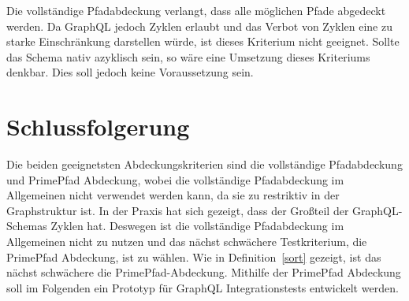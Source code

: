 Die vollständige Pfadabdeckung verlangt, dass alle möglichen Pfade abgedeckt werden.
Da GraphQL jedoch Zyklen erlaubt und das Verbot von Zyklen eine zu starke Einschränkung darstellen würde, ist dieses Kriterium nicht geeignet.
Sollte das Schema nativ azyklisch sein, so wäre eine Umsetzung dieses Kriteriums denkbar.
Dies soll jedoch keine Voraussetzung sein.

\section{Schlussfolgerung}
\label{fazitcov}

Die beiden geeignetsten Abdeckungskriterien sind die vollständige Pfadabdeckung und PrimePfad Abdeckung, wobei die vollständige Pfadabdeckung im
Allgemeinen nicht verwendet werden kann, da sie zu restriktiv in der Graphstruktur ist.
In der Praxis hat sich gezeigt, dass der Großteil der GraphQL-Schemas Zyklen hat.
Deswegen ist die vollständige Pfadabdeckung im Allgemeinen nicht zu nutzen und das nächst schwächere Testkriterium, die PrimePfad Abdeckung, ist zu wählen.
Wie in Definition~\ref{sort} gezeigt, ist das nächst schwächere die PrimePfad-Abdeckung.
Mithilfe der PrimePfad Abdeckung soll im Folgenden ein Prototyp für GraphQL Integrationstests entwickelt werden.




